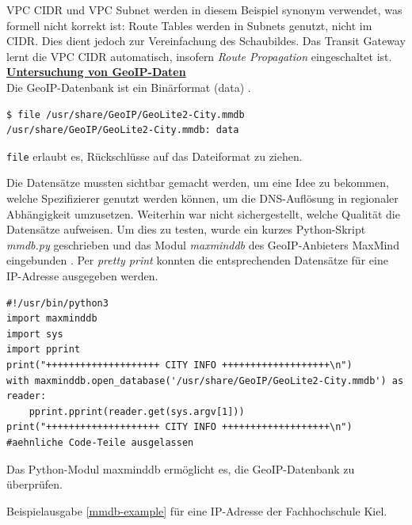 VPC CIDR und VPC Subnet werden in diesem Beispiel synonym verwendet, was formell nicht korrekt ist: Route Tables werden in Subnets genutzt, nicht im CIDR. Dies dient jedoch zur Vereinfachung des Schaubildes. Das Transit Gateway lernt die VPC CIDR automatisch, insofern \textit{Route Propagation} eingeschaltet ist.
\newpage
\textbf{\underline{Untersuchung von GeoIP-Daten}}\\
Die GeoIP-Datenbank ist ein Binärformat (\glqq data\grqq{}) \cite{filemanpage2021}.
\begin{listing}[h]
\begin{verbatim}
$ file /usr/share/GeoIP/GeoLite2-City.mmdb
/usr/share/GeoIP/GeoLite2-City.mmdb: data

\end{verbatim}
\caption{\texttt{file} erlaubt es, Rückschlüsse auf das Dateiformat zu ziehen.}
\label{file-geoip-db}
\end{listing}\FloatBarrier
Die Datensätze mussten \glqq sichtbar\grqq{} gemacht werden, um eine Idee zu bekommen, welche Spezifizierer genutzt werden können, um die DNS-Auflösung in regionaler Abhängigkeit umzusetzen. Weiterhin war nicht sichergestellt, welche Qualität die Datensätze aufweisen. Um dies zu testen, wurde ein kurzes Python-Skript \textit{mmdb.py} geschrieben und das Modul \textit{maxminddb} des GeoIP-Anbieters MaxMind eingebunden \cite{maxminddbreader2021}. Per \textit{pretty print} konnten die entsprechenden Datensätze für eine IP-Adresse ausgegeben werden.
\begin{listing}[h]
\begin{verbatim}
#!/usr/bin/python3
import maxminddb
import sys
import pprint
print("++++++++++++++++++++ CITY INFO +++++++++++++++++++\n")
with maxminddb.open_database('/usr/share/GeoIP/GeoLite2-City.mmdb') as reader:
    pprint.pprint(reader.get(sys.argv[1]))
print("++++++++++++++++++++ CITY INFO +++++++++++++++++++\n")
#aehnliche Code-Teile ausgelassen
\end{verbatim}
\caption{Das Python-Modul maxminddb ermöglicht es, die GeoIP-Datenbank zu überprüfen.}
\label{python-mmdb-reader}
\end{listing}\FloatBarrier
\newpage
Beispielausgabe \ref{mmdb-example} für eine IP-Adresse der Fachhochschule Kiel.
